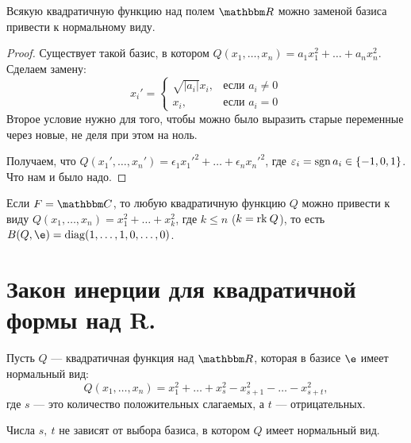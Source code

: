 \begin{Consequence}
Всякую квадратичную функцию над полем $\R$ можно заменой базиса привести к нормальному виду.
\end{Consequence}

\begin{proof}
Существует такой базис, в котором $Q(x_1, \ldots, x_n) = a_1x_1^2 + \ldots + a_nx_n^2$. Сделаем замену:
$$
x_i' = 
\begin{cases}
\sqrt{|a_i|}x_i, & \text{если } a_i \neq 0 \\
x_i, & \text{если } a_i = 0
\end{cases}
$$
Второе условие нужно для того, чтобы можно было выразить старые переменные через новые, не деля при этом на ноль.

Получаем, что $Q(x_1', \ldots, x_n') = \epsilon_1x_1'^2 + \ldots + \epsilon_nx_n'^2$, где $\varepsilon_i = \operatorname{\mathop{sgn}} a_i \in \{-1, 0, 1\}$. Что нам и было надо.
\end{proof}

\begin{Comment}
Если $F = \C$, то любую квадратичную функцию $Q$ можно привести к виду $Q(x_1, \ldots, x_n) = x_1^2 + \ldots + x_k^2$, где $k \leqslant n$ ($k = \mathrm{rk}\: Q$), то есть $B(Q, \e) = \diag(1, \ldots, 1, 0, \ldots, 0)$.
\end{Comment}

\section{Закон инерции для квадратичной формы над R.}

Пусть $Q$ --- квадратичная функция над $\R$, которая в базисе $\e$ имеет нормальный вид: 
$$
Q(x_1, \ldots, x_n) = x_1^2 + \ldots + x_s^2 - x_{s + 1}^2 - \ldots - x_{s + t}^2,
$$
где $s$ --- это количество положительных слагаемых, а $t$ --- отрицательных.

\begin{Theorem}
Числа $s,\ t$ не зависят от выбора базиса, в котором $Q$ имеет нормальный вид.
\end{Theorem}


